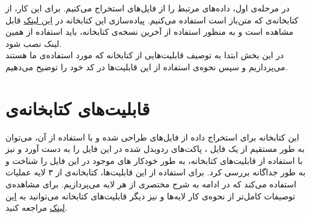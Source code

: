 در مرحله‌ی اول، داده‌های مرتبط را از فایل‌های
استخراج می‌کنیم. برای این کار، از کتابخانه‌ی
که متن‌باز است استفاده می‌کنیم.
پیاده‌سازی این کتابخانه در 
\href{https://github.com/aouinizied/nfstream}{‌این لینک}
قابل مشاهده است و به منظور استفاده از آخرین نسخه‌ی کتابخانه، باید استفاده از همین لینک نصب شود.\\
در این بخش ابتدا به توصیف قابلیت‌هایی از کتابخانه که مورد استفاده‌ی ما هستند می‌پردازیم و سپس نحوه‌ی استفاده از این قابلیت‌ها در کد خود را توضیح می‌دهیم.\\
\section{قابلیت‌های کتابخانه‌ی
}
این کتابخانه برای استخراج داده از فایل‌های
طراحی شده و با استفاده از آن، می‌توان به طور مستقیم از یک فایل
،
پاکت‌های رد‌وبدل شده در این فایل را به دست آورد و نیز با استفاده از قابلیت‌های کتابخانه، به طور خودکار 
‌های
موجود در این فایل را شناخت و به طور جداگانه بررسی کرد. برای استفاده از این قابلیت‌ها، کتابخانه‌ی
از ۳ لایه عملیات استفاده می‌کند که در ادامه به شرح مختصری از هر لایه می‌پردازیم. برای مشاهده‌ی توصیفات کامل‌تر از نحوه‌ی کار لایه‌ها و نیز دیگر قابلیت‌های کتابخانه می‌توانید به 
\href{https://nfstream.github.io/docs/api}{این لینک}
مراجعه کنید.
